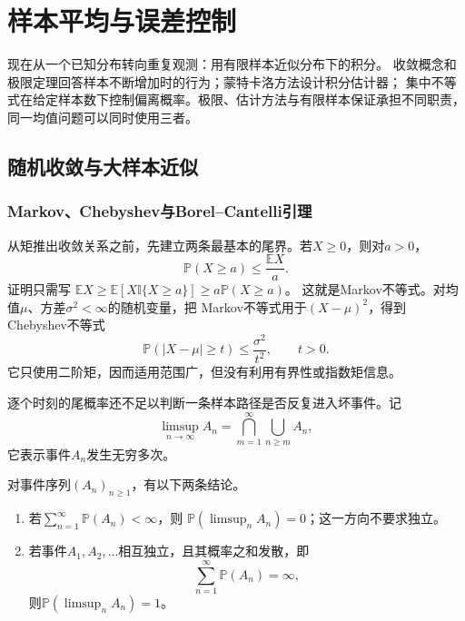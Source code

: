 \section{样本平均与误差控制}
\label{sec:probability-averages-errors}

现在从一个已知分布转向重复观测：用有限样本近似分布下的积分。
收敛概念和极限定理回答样本不断增加时的行为；蒙特卡洛方法设计积分估计器；
集中不等式在给定样本数下控制偏离概率。极限、估计方法与有限样本保证承担不同职责，
同一均值问题可以同时使用三者。

\subsection{随机收敛与大样本近似}
\label{sec:probability-random-convergence-asymptotics}

\subsubsection{Markov、Chebyshev与Borel--Cantelli引理}
\label{sec:probability-basic-tail-bounds}

从矩推出收敛关系之前，先建立两条最基本的尾界。若\(X\geq0\)，则对\(a>0\)，
\begin{equation}
  \mathbb{P}(X\geq a)
  \leq
  \frac{\mathbb{E}X}{a}.
  \label{eq:probability-markov-inequality}
\end{equation}
证明只需写
\(\mathbb{E}X\geq
\mathbb{E}[X\mathbb{I}\{X\geq a\}]
\geq a\mathbb{P}(X\geq a)\)。
这就是Markov不等式。对均值\(\mu\)、方差\(\sigma^2<\infty\)的随机变量，把
Markov不等式用于\((X-\mu)^2\)，得到Chebyshev不等式
\begin{equation}
  \mathbb{P}(|X-\mu|\geq t)
  \leq\frac{\sigma^2}{t^2},
  \qquad t>0.
  \label{eq:probability-chebyshev-inequality}
\end{equation}
它只使用二阶矩，因而适用范围广，但没有利用有界性或指数矩信息。

逐个时刻的尾概率还不足以判断一条样本路径是否反复进入坏事件。记
\[
  \limsup_{n\to\infty}A_n
  =
  \bigcap_{m=1}^{\infty}\bigcup_{n\geq m}A_n,
\]
它表示事件\(A_n\)发生无穷多次。
\begin{theorem}
  \label{thm:probability-borel-cantelli}
  对事件序列\((A_n)_{n\geq1}\)，有以下两条结论。
  \begin{enumerate}
    \item 若\(\sum_{n=1}^{\infty}\mathbb{P}(A_n)<\infty\)，则
    \(\mathbb{P}(\limsup_n A_n)=0\)；这一方向不要求独立。
    \item 若事件\(A_1,A_2,\ldots\)相互独立，且其概率之和发散，即
    \[
      \sum_{n=1}^{\infty}\mathbb{P}(A_n)=\infty,
    \]
    则\(\mathbb{P}(\limsup_n A_n)=1\)。
  \end{enumerate}
\end{theorem}

